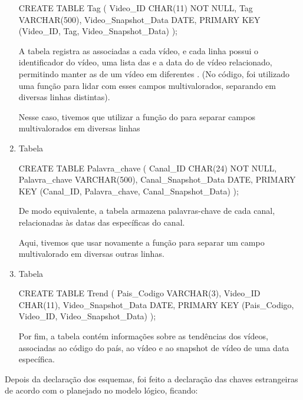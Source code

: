 \begin{enumerate}
  \begin{code}
    CREATE TABLE Tag (
      Video_ID CHAR(11) NOT NULL,
      Tag VARCHAR(500),
      Video_Snapshot_Data DATE,
      PRIMARY KEY (Video_ID, Tag, Video_Snapshot_Data)
    );
  \end{code}

  A tabela  registra as  associadas a cada vídeo, e cada linha possui o identificador do vídeo, uma lista das  e a data do  de vídeo relacionado, permitindo manter as  de um vídeo em diferentes . (No código, foi utilizado uma função para lidar com esses campos multivalorados, separando em diversas linhas distintas).

  Nesse caso, tivemos que utilizar a função  do  para separar campos multivalorados em diversas linhas

  \item Tabela 

  \begin{code}
    CREATE TABLE Palavra_chave (
      Canal_ID CHAR(24) NOT NULL,
      Palavra_chave VARCHAR(500),
      Canal_Snapshot_Data DATE,
      PRIMARY KEY (Canal_ID, Palavra_chave, Canal_Snapshot_Data)
    );
  \end{code}

  De modo equivalente, a tabela  armazena palavras-chave de cada canal, relacionadas às datas das  específicas do canal.

  Aqui, tivemos que usar novamente a função para separar um campo multivalorado em diversas outras linhas.

  \item Tabela 

  \begin{code}
    CREATE TABLE Trend (
      Pais_Codigo VARCHAR(3),
      Video_ID CHAR(11),
      Video_Snapshot_Data DATE,
      PRIMARY KEY (Pais_Codigo, Video_ID, Video_Snapshot_Data)
    );
  \end{code}

  Por fim, a tabela  contém informações sobre as tendências dos vídeos, associadas ao código do país, ao vídeo e ao snapshot de vídeo de uma data específica.
\end{enumerate}

Depois da declaração dos esquemas, foi feito a declaração das chaves estrangeiras de acordo com o planejado no modelo lógico, ficando:

